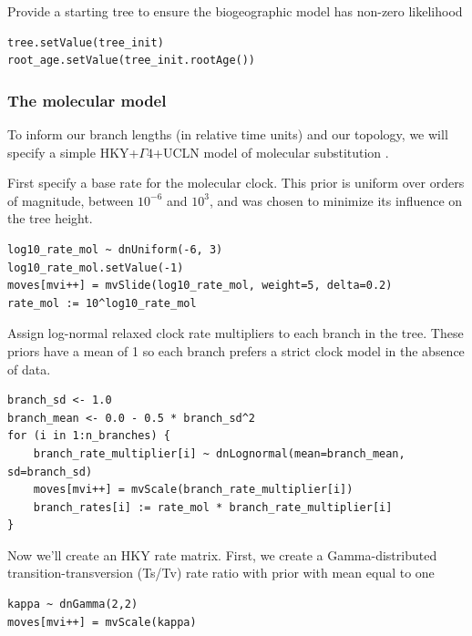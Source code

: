 Provide a starting tree to ensure the biogeographic model has non-zero likelihood

\begin{snugshade}
\begin{lstlisting}
tree.setValue(tree_init)
root_age.setValue(tree_init.rootAge())
\end{lstlisting}
\end{snugshade}


\subsubsection{The molecular model}

To inform our branch lengths (in relative time units) and our topology, we will specify a simple HKY+$\Gamma4$+UCLN model of molecular substitution \citep{Hasegawa1985,Yang1998,Drummond2006}.

First specify a base rate for the molecular clock.
This prior is uniform over orders of magnitude, between $10^{-6}$ and $10^3$, and was chosen to minimize its influence on the tree height.

\begin{snugshade}
\begin{lstlisting}
log10_rate_mol ~ dnUniform(-6, 3)
log10_rate_mol.setValue(-1)
moves[mvi++] = mvSlide(log10_rate_mol, weight=5, delta=0.2)
rate_mol := 10^log10_rate_mol
\end{lstlisting}
\end{snugshade}

Assign log-normal relaxed clock rate multipliers to each branch in the tree.
These priors have a mean of 1 so each branch prefers a strict clock model in the absence of data.
\begin{snugshade}
\begin{lstlisting}
branch_sd <- 1.0
branch_mean <- 0.0 - 0.5 * branch_sd^2
for (i in 1:n_branches) {
    branch_rate_multiplier[i] ~ dnLognormal(mean=branch_mean, sd=branch_sd)
    moves[mvi++] = mvScale(branch_rate_multiplier[i])
    branch_rates[i] := rate_mol * branch_rate_multiplier[i]
}
\end{lstlisting}
\end{snugshade}

Now we'll create an HKY rate matrix.
First, we create a Gamma-distributed transition-transversion (Ts/Tv) rate ratio with prior with mean equal to one

\begin{snugshade}
\begin{lstlisting}
kappa ~ dnGamma(2,2)
moves[mvi++] = mvScale(kappa)
\end{lstlisting}
\end{snugshade}


